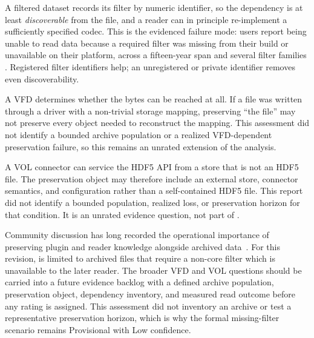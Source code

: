 \documentclass[../main.tex]{subfiles}
\begin{document}
\begin{description}[leftmargin=1.5em,style=nextline]
    \item[Filter plugins.]
    A filtered dataset records its filter by numeric identifier, so the
    dependency is at least \emph{discoverable} from the file, and a reader can
    in principle re-implement a sufficiently specified codec. This is the
    evidenced failure mode: users report being unable to read data because a
    required filter was missing from their build or unavailable on their
    platform, across a fifteen-year span and several filter families
    \cite{forum-filter-compressed-2756,forum-filter-h5dump-3396,
    forum-filter-dynamic-4047,forum-filter-lzo-4102}. Registered filter
    identifiers help; an unregistered or private identifier removes even
    discoverability.

    \item[Virtual file drivers.]
    A VFD determines whether the bytes can be reached at all. If a file was
    written through a driver with a non-trivial storage mapping, preserving
    ``the file'' may not preserve every object needed to reconstruct the
    mapping. This assessment did not identify a bounded archive population or a
    realized VFD-dependent preservation failure, so this remains an unrated
    extension of the analysis.

    \item[VOL connectors.]
    A VOL connector can service the HDF5 API from a store that is not an HDF5
    file. The preservation object may therefore include an external store,
    connector semantics, and configuration rather than a self-contained HDF5
    file. This report did not identify a bounded population, realized loss, or
    preservation horizon for that condition. It is an unrated evidence question,
    not part of .
\end{description}

Community discussion has long recorded the operational importance of preserving
plugin and reader knowledge alongside archived data~\cite{forum-plugin}. For
this revision,  is limited to archived files that require a
non-core filter which is unavailable to the later reader. The broader VFD and
VOL questions should be carried into a future evidence backlog with a defined
archive population, preservation object, dependency inventory, and measured
read outcome before any rating is assigned. This assessment did not inventory
an archive or test a representative preservation horizon, which is why the
formal missing-filter scenario remains Provisional with Low confidence.
\end{document}

